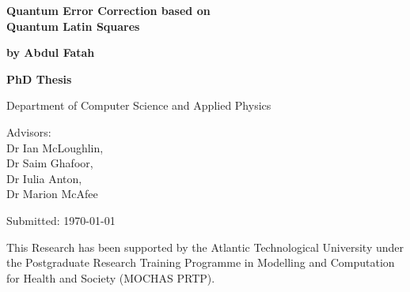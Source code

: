 \newcommand{\thesistitle}{Quantum Error Correction based on \\Quantum Latin Squares}
\newcommand{\thesisauthor}{by Abdul Fatah}
\newcommand{\thesisadvisor}{Advisors:\\Dr Ian McLoughlin, \\Dr Saim Ghafoor, \\Dr Iulia Anton, \\Dr Marion McAfee}
\newcommand{\thesistype}{PhD Thesis}
\newcommand{\thesisdate}{Submitted: \today}
\newcommand{\thesisdepartment}{Department of Computer Science and Applied Physics}
\newcommand{\thesisfunding}{This Research has been supported by the Atlantic Technological University under the Postgraduate Research Training Programme in Modelling and Computation for Health and Society (MOCHAS PRTP).}

\begin{titlingpage}
  
  {\noindent\huge\textbf{\thesistitle}\par}
  \vspace{12mm}
  {\noindent\LARGE\textbf{\thesisauthor}\par}
  \vspace{26mm}
  {\noindent\Large\textbf{\thesistype}\par}
  \vspace{2mm}
  {\noindent\Large\thesisdepartment\par}
  \vspace{2mm}
  {\noindent\Large\thesisadvisor\par}
  \vspace{2mm}
  {\noindent\Large\thesisdate\par}
  \vspace{26mm}
  {\noindent\thesisfunding\par}

  
\end{titlingpage}